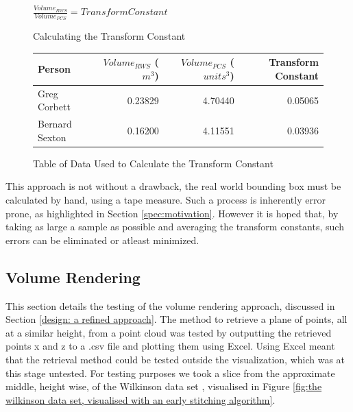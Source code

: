 \begin{figure}[h]
\begin{center}
$\frac{Volume_{RWS}}{Volume_{PCS}} = Transform Constant$
\end{center}
\caption{Calculating the Transform Constant}
\label{testing: calculating the transform constant}
\end{figure}
\begin{figure}[h]
\begin{center}
  \begin{tabular}{| l | r | r | r |}
    \hline
    Person & $Volume_{RWS}$ ($m^3$) & $Volume_{PCS}$ ($units^3$) & Transform Constant \\ \hline
    Greg Corbett 	& 0.23829 & 4.70440 & 0.05065\\ \hline
    Bernard Sexton 	& 0.16200 & 4.11551 & 0.03936\\ \hline
  \end{tabular}
\end{center}
\caption{Table of Data Used to Calculate the Transform Constant}
\label{testing: table of data used to calculate the transform constant}
\end{figure}

This approach is not without a drawback, the real world bounding box must be calculated by hand, using a tape measure. Such a process is inherently error prone, as highlighted in Section \ref{spec:motivation}. However it is hoped that, by taking as large a sample as possible and averaging the transform constants, such errors can be eliminated or atleast minimized.\\

\subsection{Volume Rendering}
\label{testing: volume rendering}
This section details the testing of the volume rendering approach, discussed in Section \ref{design: a refined approach}. The method to retrieve a plane of points, all at a similar height, from a point cloud was tested by outputting the retrieved points x and z to a .csv file and plotting them using Excel. Using Excel meant that the retrieval method could be tested outside the visualization, which was at this stage untested. For testing purposes we took a slice from the approximate middle, height wise, of the Wilkinson data set , visualised in Figure \ref{fig:the wilkinson data set, visualised with an early stitching algorithm}.\\

